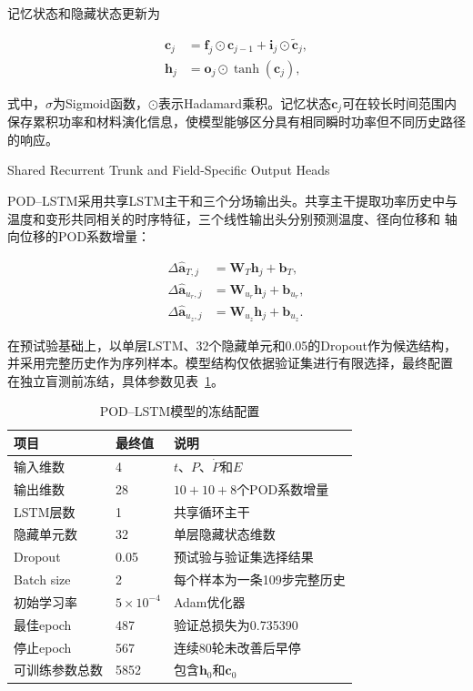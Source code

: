 记忆状态和隐藏状态更新为

\begin{align}
	\boldsymbol{c}_j
	&=
	\boldsymbol{f}_j\odot\boldsymbol{c}_{j-1}
	+
	\boldsymbol{i}_j\odot\widetilde{\boldsymbol{c}}_j,
	\label{eq:lstm_cell_update}\\
	\boldsymbol{h}_j
	&=
	\boldsymbol{o}_j\odot\tanh(\boldsymbol{c}_j),
	\label{eq:lstm_hidden_update}
\end{align}

式中，$\sigma$为Sigmoid函数，$\odot$表示Hadamard乘积。记忆状态$\boldsymbol{c}_j$可在较长时间范围内保存累积功率和材料演化信息，使模型能够区分具有相同瞬时功率但不同历史路径的响应。

{Shared Recurrent Trunk and Field-Specific Output Heads}

POD--LSTM采用共享LSTM主干和三个分场输出头。共享主干提取功率历史中与
温度和变形共同相关的时序特征，三个线性输出头分别预测温度、径向位移和
轴向位移的POD系数增量：

\begin{align}
	\Delta\widehat{\boldsymbol a}_{T,j}
	&=\boldsymbol W_T\boldsymbol h_j+\boldsymbol b_T,\\
	\Delta\widehat{\boldsymbol a}_{u_r,j}
	&=\boldsymbol W_{u_r}\boldsymbol h_j+\boldsymbol b_{u_r},\\
	\Delta\widehat{\boldsymbol a}_{u_z,j}
	&=\boldsymbol W_{u_z}\boldsymbol h_j+\boldsymbol b_{u_z}.
	\label{eq:formal_lstm_heads}
\end{align}

在预试验基础上，以单层LSTM、32个隐藏单元和0.05的Dropout作为候选结构，
并采用完整历史作为序列样本。模型结构仅依据验证集进行有限选择，最终配置
在独立盲测前冻结，具体参数见表~\ref{tab:formal_lstm_configuration}。

\begin{table}[htbp]
	\centering
	\caption{POD--LSTM模型的冻结配置}
	\label{tab:formal_lstm_configuration}
	\begin{tabularx}{\textwidth}
		{XXX}
		\toprule
		项目 & 最终值 & 说明 \\
		\midrule
		输入维数 & 4 & $t$、$P$、$\dot P$和$E$ \\
		输出维数 & 28 & $10+10+8$个POD系数增量 \\
		LSTM层数 & 1 & 共享循环主干 \\
		隐藏单元数 & 32 & 单层隐藏状态维数 \\
		Dropout & 0.05 & 预试验与验证集选择结果 \\
		Batch size & 2 & 每个样本为一条109步完整历史 \\
		初始学习率 & $5\times10^{-4}$ & Adam优化器 \\
		最佳epoch & 487 & 验证总损失为0.735390 \\
		停止epoch & 567 & 连续80轮未改善后早停 \\
		可训练参数总数 & 5852 & 包含$\boldsymbol h_0$和$\boldsymbol c_0$ \\
		\bottomrule
	\end{tabularx}
\end{table}


